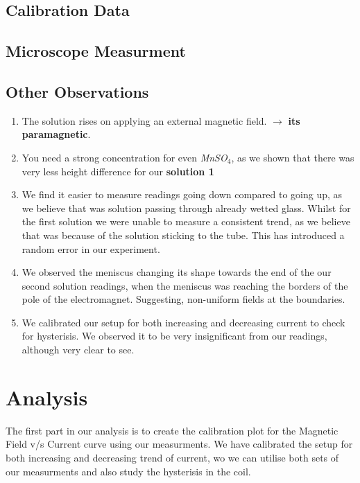 \documentclass[../main.tex]{subfiles}
\begin{document}
\subsection{Calibration Data}


\subsection{Microscope Measurment}


\subsection{Other Observations}
\begin{enumerate}
	\item The solution rises on applying an external magnetic field. $\to$ \textbf{its paramagnetic}.
	\item You need a strong concentration for even \textit{MnSO$_4$}, as we shown that there was very less height difference for our \textbf{solution 1}
	\item We find it easier to measure readings going down compared to going up, as we believe that was solution passing through already wetted glass. Whilst for the first solution we were unable to measure a consistent trend, as we believe that was because of the solution sticking to the tube. This has introduced a random error in our experiment.
	\item We observed the meniscus changing its shape towards the end of the our second solution readings, when the meniscus was reaching the borders of the pole of the electromagnet. Suggesting, non-uniform fields at the boundaries.
	\item We calibrated our setup for both increasing and decreasing current to check for hysterisis. We observed it to be very insignificant from our readings, although very clear to see.
\end{enumerate}

\section{Analysis}
The first part in our analysis is to create the calibration plot for the Magnetic Field v/s Current curve using our measurments. We have calibrated the setup for both increasing and decreasing trend of current, wo we can utilise both sets of our measurments and also study the hysterisis in the coil.
\end{document}

